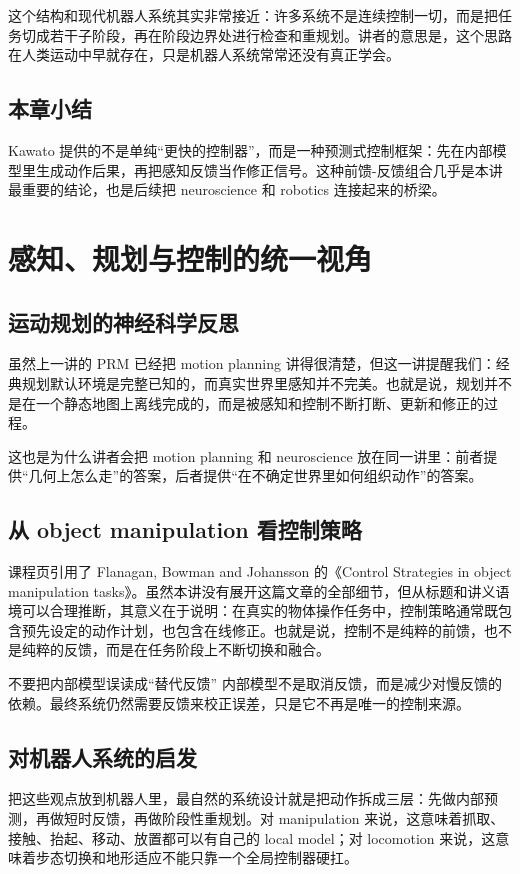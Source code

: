 \documentclass[a4paper]{article}
\begin{document}
这个结构和现代机器人系统其实非常接近：许多系统不是连续控制一切，而是把任务切成若干子阶段，再在阶段边界处进行检查和重规划。讲者的意思是，这个思路在人类运动中早就存在，只是机器人系统常常还没有真正学会。

\subsection{本章小结}
Kawato 提供的不是单纯“更快的控制器”，而是一种预测式控制框架：先在内部模型里生成动作后果，再把感知反馈当作修正信号。这种前馈-反馈组合几乎是本讲最重要的结论，也是后续把 neuroscience 和 robotics 连接起来的桥梁。

\section{感知、规划与控制的统一视角}
\subsection{运动规划的神经科学反思}
虽然上一讲的 PRM 已经把 motion planning 讲得很清楚，但这一讲提醒我们：经典规划默认环境是完整已知的，而真实世界里感知并不完美。也就是说，规划并不是在一个静态地图上离线完成的，而是被感知和控制不断打断、更新和修正的过程。

这也是为什么讲者会把 motion planning 和 neuroscience 放在同一讲里：前者提供“几何上怎么走”的答案，后者提供“在不确定世界里如何组织动作”的答案。

\subsection{从 object manipulation 看控制策略}
课程页引用了 Flanagan, Bowman and Johansson 的《Control Strategies in object manipulation tasks》。虽然本讲没有展开这篇文章的全部细节，但从标题和讲义语境可以合理推断，其意义在于说明：在真实的物体操作任务中，控制策略通常既包含预先设定的动作计划，也包含在线修正。也就是说，控制不是纯粹的前馈，也不是纯粹的反馈，而是在任务阶段上不断切换和融合。

\begin{warningbox}{不要把内部模型误读成“替代反馈”}
内部模型不是取消反馈，而是减少对慢反馈的依赖。最终系统仍然需要反馈来校正误差，只是它不再是唯一的控制来源。
\end{warningbox}

\subsection{对机器人系统的启发}
把这些观点放到机器人里，最自然的系统设计就是把动作拆成三层：先做内部预测，再做短时反馈，再做阶段性重规划。对 manipulation 来说，这意味着抓取、接触、抬起、移动、放置都可以有自己的 local model；对 locomotion 来说，这意味着步态切换和地形适应不能只靠一个全局控制器硬扛。
\end{document}
